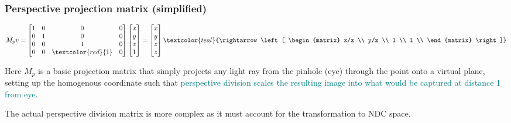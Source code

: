 \documentclass{beamer}
\begin{document}
\begin{frame}
    \frametitle{Perspective projection matrix (simplified)}

    \begin{tcolorbox}
        \begin{equation*}
            M_p v 
            = \left[ \begin{matrix}
                1 & 0 & 0 & 0\\
                0 & 1 & 0 & 0\\
                0 & 0 & 1 & 0\\
                0 & 0 & \textcolor{red}{1} & 0\\
            \end{matrix} \right]
            \left[ \begin{matrix} x \\ y \\ z \\ 1 \\ \end{matrix} \right]
            = \left[ \begin{matrix} x \\ y \\ z \\ z \\ \end{matrix} \right]
            \textcolor{teal}{\rightarrow \left[ \begin{matrix} x/z \\ y/z \\ 1 \\ 1 \\ \end{matrix} \right]}
        \end{equation*}
    \end{tcolorbox}

    Here $M_p$ is a basic projection matrix that simply projects any light ray from the pinhole (eye)
    through the point onto a virtual plane, setting up the homogenous coordinate such that
    \textcolor{teal}{perspective division scales the resulting image into what would be captured at distance 1 from eye}.

    {\footnotesize The actual perspective division matrix is more complex as it must account for the 
    transformation to NDC space.}

\end{frame}
\end{document}
